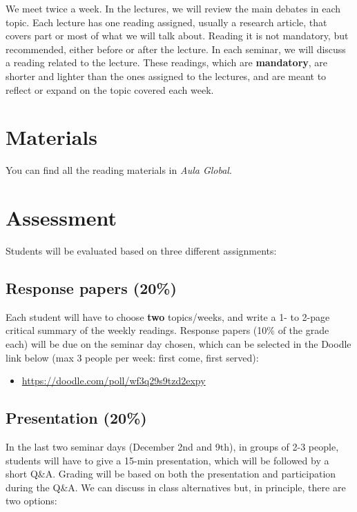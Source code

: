 \documentclass[12pt, a4paper]{article}
\begin{document}
We meet twice a week. In the lectures, we will review the main debates in each topic. Each lecture has one reading assigned, usually a research article, that covers part or most of what we will talk about. Reading it is not mandatory, but recommended, either before or after the lecture. In each seminar, we will discuss a reading related to the lecture. These readings, which are \textbf{mandatory}, are shorter and lighter than the ones assigned to the lectures, and are meant to reflect or expand on the topic covered each week.

\section{Materials}

You can find all the reading materials in \textit{Aula Global}.

\newpage
\section{Assessment}

Students will be evaluated based on three different assignments:

\subsection*{Response papers (20\%)}

Each student will have to choose \textbf{two} topics/weeks, and write a 1- to 2-page critical summary of the weekly readings. Response papers (10\% of the grade each) will be due on the seminar day chosen, which can be selected in the Doodle link below (max 3 people per week: first come, first served):

\begin{itemize}
\setlength\itemsep{0pt}
\item[] \href{https://doodle.com/poll/wf3q29s9tzd2expy}{https://doodle.com/poll/wf3q29s9tzd2expy}
\end{itemize}

\subsection*{Presentation (20\%)}

In the last two seminar days (December 2nd and 9th), in groups of 2-3 people, students will have to give a 15-min presentation, which will be followed by a short Q\&A. Grading will be based on both the presentation and participation during the Q\&A. We can discuss in class alternatives but, in principle, there are two options:
\end{document}
